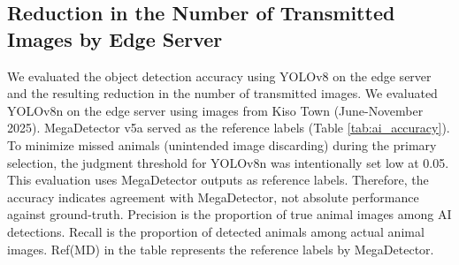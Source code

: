 \documentclass[conference]{IEEEtran}
\begin{document}
\begin{table}[tb]
    \caption{Communication Performance (Line-of-Sight Environment)}
    \label{tab:comm_perf}
    \vspace{-0.2cm}
    \begin{center}\footnotesize
    \end{center}
    \vspace{-0.4cm}
\end{table}

\subsection{Reduction in the Number of Transmitted Images by Edge Server}
We evaluated the object detection accuracy using YOLOv8 on the edge server and the resulting reduction in the number of transmitted images. We evaluated YOLOv8n on the edge server using images from Kiso Town (June-November 2025). MegaDetector v5a served as the reference labels (Table \ref{tab:ai_accuracy}). To minimize missed animals (unintended image discarding) during the primary selection, the judgment threshold for YOLOv8n was intentionally set low at 0.05. This evaluation uses MegaDetector outputs as reference labels. Therefore, the accuracy indicates agreement with MegaDetector, not absolute performance against ground-truth. Precision is the proportion of true animal images among AI detections. Recall is the proportion of detected animals among actual animal images. Ref(MD) in the table represents the reference labels by MegaDetector.
\end{document}
